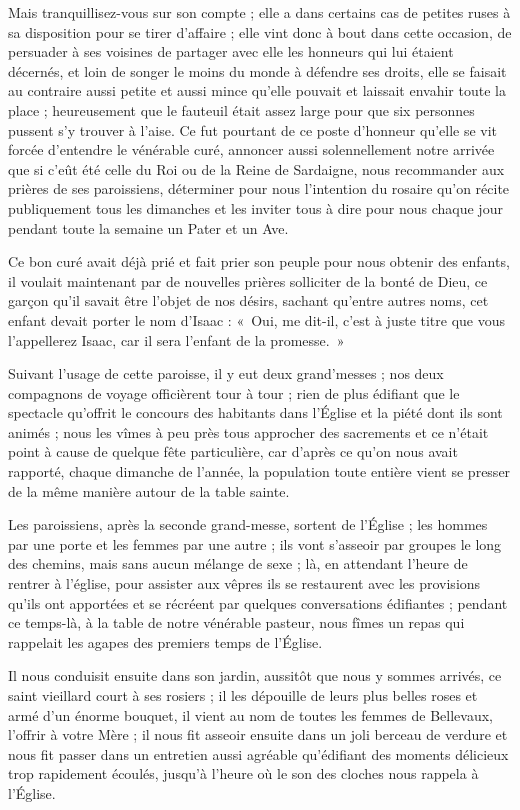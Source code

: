 \documentclass[11pt,a4paper]{report}
\begin{document}
Mais tranquillisez-vous sur son compte ; elle a dans certains cas de petites ruses à sa disposition pour se tirer d'affaire ; elle vint donc à bout dans cette occasion, de persuader à ses voisines de partager avec elle les honneurs qui lui étaient décernés, et loin de songer le moins du monde à défendre ses droits, elle se faisait au contraire aussi petite et aussi mince qu'elle pouvait et laissait envahir toute la place ; heureusement que le fauteuil était assez large pour que six personnes pussent s'y trouver à l'aise. Ce fut pourtant de ce poste d'honneur qu'elle se vit forcée d'entendre le vénérable curé, annoncer aussi solennellement notre arrivée que si c'eût été celle du Roi ou de la Reine de Sardaigne, nous recommander aux prières de ses paroissiens, déterminer pour nous l'intention du rosaire qu'on récite publiquement tous les dimanches et les inviter tous à dire pour nous chaque jour pendant toute la semaine un Pater et un Ave.

Ce bon curé avait déjà prié et fait prier son peuple pour nous obtenir des enfants, il voulait maintenant par de nouvelles prières solliciter de la bonté de Dieu, ce garçon qu'il savait être l'objet de nos désirs, sachant qu'entre autres noms, cet enfant devait porter le nom d'Isaac : «~Oui, me dit-il, c'est à juste titre que vous l'appellerez Isaac, car il sera l'enfant de la promesse.~»

Suivant l'usage de cette paroisse, il y eut deux grand'messes ; nos deux compagnons de voyage officièrent tour à tour ; rien de plus édifiant que le spectacle qu'offrit le concours des habitants dans l'Église et la piété dont ils sont animés ; nous les vîmes à peu près tous approcher des sacrements et ce n'était point à cause de quelque fête particulière, car d'après ce qu'on nous avait rapporté, chaque dimanche de l'année, la population toute entière vient se presser de la même manière autour de la table sainte.

Les paroissiens, après la seconde grand-messe, sortent de l'Église ; les hommes par une porte et les femmes par une autre ; ils vont s'asseoir par groupes le long des chemins, mais sans aucun mélange de sexe ; là, en attendant l'heure de rentrer à l'église, pour assister aux vêpres ils se restaurent avec les provisions qu'ils ont apportées et se récréent par quelques conversations édifiantes ; pendant ce temps-là, à la table de notre vénérable pasteur, nous fîmes un repas qui rappelait les agapes des premiers temps de l'Église.

Il nous conduisit ensuite dans son jardin, aussitôt que nous y sommes arrivés, ce saint vieillard court à ses rosiers ; il les dépouille de leurs plus belles roses et armé d'un énorme bouquet, il vient au nom de toutes les femmes de Bellevaux, l'offrir à votre Mère ; il nous fit asseoir ensuite dans un joli berceau de verdure et nous fit passer dans un entretien aussi agréable qu'édifiant des moments délicieux trop rapidement écoulés, jusqu'à l'heure où le son des cloches nous rappela à l'Église.
\end{document}

